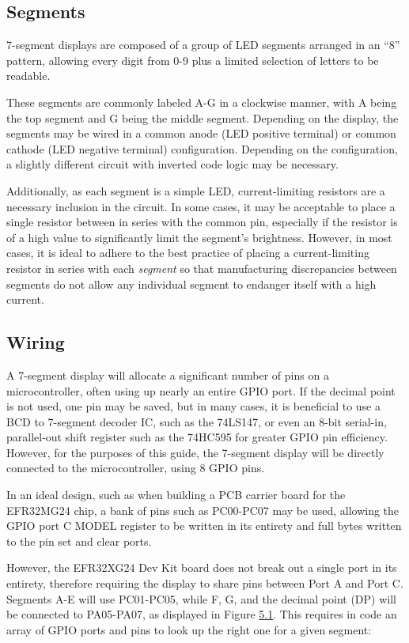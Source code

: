 \documentclass[
  9pt,
  letterpaper,
  abstract,
  titlepage]{scrbook}
\begin{document}
\subsection{Segments}\label{segments}

7-segment displays are composed of a group of LED segments arranged in
an ``8'' pattern, allowing every digit from 0-9 plus a limited selection
of letters to be readable.

These segments are commonly labeled A-G in a clockwise manner, with A
being the top segment and G being the middle segment. Depending on the
display, the segments may be wired in a common anode (LED positive
terminal) or common cathode (LED negative terminal) configuration.
Depending on the configuration, a slightly different circuit with
inverted code logic may be necessary.

Additionally, as each segment is a simple LED, current-limiting
resistors are a necessary inclusion in the circuit. In some cases, it
may be acceptable to place a single resistor between in series with the
common pin, especially if the resistor is of a high value to
significantly limit the segment's brightness. However, in most cases, it
is ideal to adhere to the best practice of placing a current-limiting
resistor in series with each \emph{segment} so that manufacturing
discrepancies between segments do not allow any individual segment to
endanger itself with a high current.

\subsection{Wiring}\label{wiring}

A 7-segment display will allocate a significant number of pins on a
microcontroller, often using up nearly an entire GPIO port. If the
decimal point is not used, one pin may be saved, but in many cases, it
is beneficial to use a BCD to 7-segment decoder IC, such as the 74LS147,
or even an 8-bit serial-in, parallel-out shift register such as the
74HC595 for greater GPIO pin efficiency. However, for the purposes of
this guide, the 7-segment display will be directly connected to the
microcontroller, using 8 GPIO pins.

In an ideal design, such as when building a PCB carrier board for the
EFR32MG24 chip, a bank of pins such as PC00-PC07 may be used, allowing
the GPIO port C MODEL register to be written in its entirety and full
bytes written to the pin set and clear ports.

However, the EFR32XG24 Dev Kit board does not break out a single port in
its entirety, therefore requiring the display to share pins between Port
A and Port C. Segments A-E will use PC01-PC05, while F, G, and the
decimal point (DP) will be connected to PA05-PA07, as displayed in
Figure \hyperref[fig:7-segment-wiring]{5.1}. This requires in code an
array of GPIO ports and pins to look up the right one for a given
segment:
\end{document}
